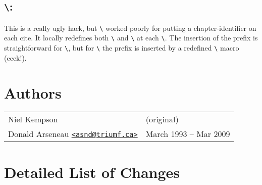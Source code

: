\documentclass[DIV=9, pagesize=auto]{scrartcl}
\makeatletter
\newcommand*{\cs}[1]{\texttt{\textbackslash#1}}
\newcommand*{\cmd}[1]{\cs{\expandafter\@gobble\string#1}}
\makeatother
\begin{document}
\subsection{\cmd{\CitationPrefix}:}

This is a really ugly hack, but \cmd{\citeform} worked poorly for putting
a chapter-identifier on each cite.  It locally redefines both
\cmd{\@bibitem} and \cmd{\@lbibitem} at each \cmd{}.  The insertion
of the prefix is straightforward for \cmd{\@lbibitem}, but for \cmd{\@bibitem}
the prefix is inserted by a redefined \cmd{\value} macro (eeek!). 



\section{Authors}

\begin{tabular}{@{}ll@{}}
  Niel Kempson                                                             & (original)             \\
  Donald Arseneau  \href{mailto:asnd@triumf.ca}{\texttt{<asnd@triumf.ca>}} & March 1993 -- Mar 2009 \\
\end{tabular}



\section{Detailed List of Changes}
\end{document}
